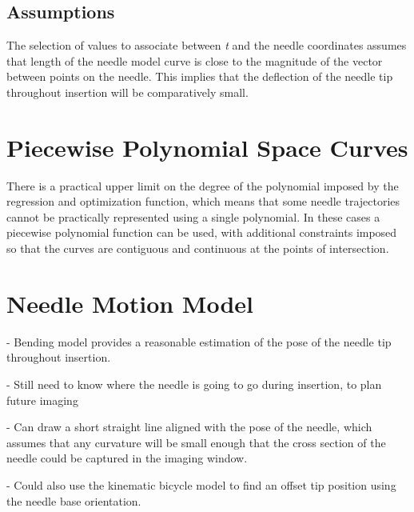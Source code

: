 \subsection{Assumptions}
The selection of values to associate between \textit{t} and the needle coordinates assumes that length of the needle model curve is close to the magnitude of the vector between points on the needle. This implies that the deflection of the needle tip throughout insertion will be comparatively small.

\section{Piecewise Polynomial Space Curves}
There is a practical upper limit on the degree of the polynomial imposed by the regression and optimization function, which means that some needle trajectories cannot be practically represented using a single polynomial. In these cases a piecewise polynomial function can be used, with additional constraints imposed so that the curves are contiguous and continuous at the points of intersection.

\section{Needle Motion Model}
- Bending model provides a reasonable estimation of the pose of the needle tip throughout insertion.

- Still need to know where the needle is going to go during insertion, to plan future imaging

- Can draw a short straight line aligned with the pose of the needle, which assumes that any curvature will be small enough that the cross section of the needle could be captured in the imaging window.

- Could also use the kinematic bicycle model to find an offset tip position using the needle base orientation.